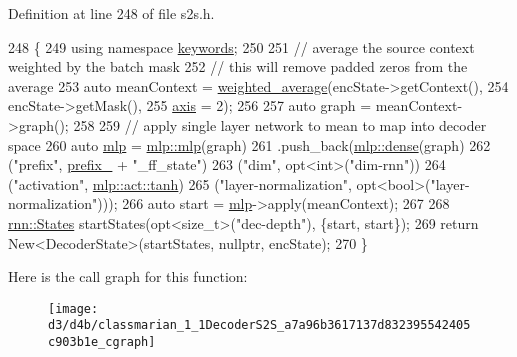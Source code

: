 Definition at line 248 of file s2s.\+h.


\begin{DoxyCode}
248                                                                    \{
249     \textcolor{keyword}{using namespace }\hyperlink{namespacekeywords}{keywords};
250 
251     \textcolor{comment}{// average the source context weighted by the batch mask}
252     \textcolor{comment}{// this will remove padded zeros from the average}
253     \textcolor{keyword}{auto} meanContext = \hyperlink{namespacemarian_a8ccb9507a69a32ecd48410fd1557f209}{weighted\_average}(encState->getContext(),
254                                         encState->getMask(),
255                                         \hyperlink{namespacemarian_1_1keywords_ace9158eabbddaca833133f12da98b9d6}{axis} = 2);
256 
257     \textcolor{keyword}{auto} graph = meanContext->graph();
258 
259     \textcolor{comment}{// apply single layer network to mean to map into decoder space}
260     \textcolor{keyword}{auto} \hyperlink{namespacemarian_1_1mlp_a4d0fe240d31bdc33bcbdb5401de49e27}{mlp} = \hyperlink{namespacemarian_1_1mlp_a4d0fe240d31bdc33bcbdb5401de49e27}{mlp::mlp}(graph)
261                .push\_back(\hyperlink{namespacemarian_1_1mlp_a8c25b1e343bf78e66cd9e33e607efeb5}{mlp::dense}(graph)
262                           (\textcolor{stringliteral}{"prefix"}, \hyperlink{classmarian_1_1DecoderBase_a043a90801b6bda9a45e309607136e947}{prefix\_} + \textcolor{stringliteral}{"\_ff\_state"})
263                           (\textcolor{stringliteral}{"dim"}, opt<int>(\textcolor{stringliteral}{"dim-rnn"}))
264                           (\textcolor{stringliteral}{"activation"}, \hyperlink{namespacemarian_1_1mlp_ac16d27a877d16d7394f2057aee439d72a5c0dbba3a6ee4ac0eb26cfee75ccb8b4}{mlp::act::tanh})
265                           (\textcolor{stringliteral}{"layer-normalization"}, opt<bool>(\textcolor{stringliteral}{"layer-normalization"})));
266     \textcolor{keyword}{auto} start = \hyperlink{namespacemarian_1_1mlp_a4d0fe240d31bdc33bcbdb5401de49e27}{mlp}->apply(meanContext);
267 
268     \hyperlink{namespaceamunmt_a4fe2912e208820f8217fbcf229ebacf7}{rnn::States} startStates(opt<size\_t>(\textcolor{stringliteral}{"dec-depth"}), \{start, start\});
269     \textcolor{keywordflow}{return} New<DecoderState>(startStates, \textcolor{keyword}{nullptr}, encState);
270   \}
\end{DoxyCode}


Here is the call graph for this function\+:
\nopagebreak
\begin{figure}[H]
\begin{center}
\leavevmode
\texttt{[image: d3/d4b/classmarian\_1\_1DecoderS2S\_a7a96b3617137d832395542405c903b1e\_cgraph]}
\end{center}
\end{figure}


